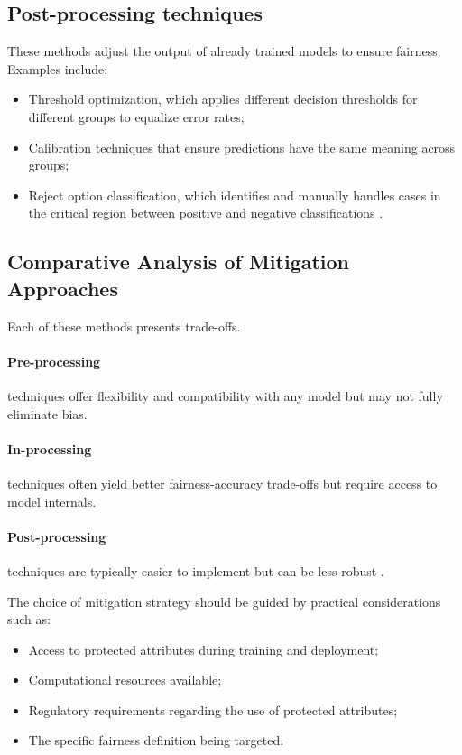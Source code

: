 \documentclass[12pt,a4paper,openright,twoside]{book}
\begin{document}
\subsection{Post-processing techniques} 
These methods adjust the output of already trained models to ensure fairness. Examples include:
\begin{itemize}
    \item Threshold optimization, which applies different decision thresholds for different groups to equalize error rates;
    \item Calibration techniques that ensure predictions have the same meaning across groups;
    \item Reject option classification, which identifies and manually handles cases in the critical region between positive and negative classifications \cite{kamiran2013quantifying}.
\end{itemize}

\subsection{Comparative Analysis of Mitigation Approaches}

Each of these methods presents trade-offs. 
\paragraph{Pre-processing} techniques offer flexibility and compatibility with any model but may not fully eliminate bias. 
\paragraph{In-processing} techniques often yield better fairness-accuracy trade-offs but require access to model internals. 
\paragraph{Post-processing} techniques are typically easier to implement but can be less robust \cite{mehrabi2021survey,suresh2021framework}.

The choice of mitigation strategy should be guided by practical considerations such as:

\begin{itemize}
    \item Access to protected attributes during training and deployment;
    \item Computational resources available;
    \item Regulatory requirements regarding the use of protected attributes;
    \item The specific fairness definition being targeted.
\end{itemize}
\end{document}
